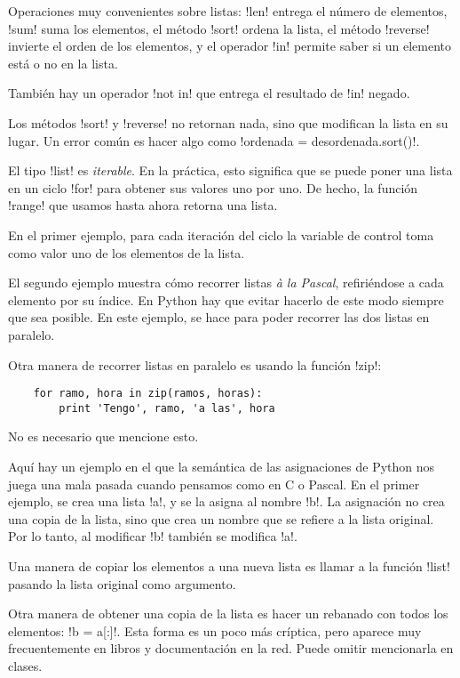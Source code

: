\documentclass[10pt]{article}
\begin{document}
  Operaciones muy convenientes sobre listas:
  \li!len! entrega el número de elementos,
  \li!sum! suma los elementos,
  el método \li!sort! ordena la lista,
  el método \li!reverse! invierte el orden de los elementos,
  y el operador \li!in! permite saber si un elemento está o no en la lista.

  También hay un operador \li!not in! que entrega el resultado de \li!in! negado.

  Los métodos \li!sort! y \li!reverse! no retornan nada,
  sino que modifican la lista en su lugar.
  Un error común es hacer algo como \li!ordenada = desordenada.sort()!.


  El tipo \li!list! es \emph{iterable}.
  En la práctica, esto significa que se puede poner una lista en un ciclo \li!for!
  para obtener sus valores uno por uno. De hecho, la función \li!range! que usamos hasta ahora
  retorna una lista.

  En el primer ejemplo,
  para cada iteración del ciclo la variable de control toma como valor
  uno de los elementos de la lista.

  El segundo ejemplo muestra cómo recorrer listas \emph{à la Pascal},
  refiriéndose a cada elemento por su índice.
  En Python hay que evitar hacerlo de este modo siempre que sea posible.
  En este ejemplo, se hace para poder recorrer las dos listas en paralelo.

  Otra manera de recorrer listas en paralelo
  es usando la función \li!zip!:
  \begin{lstlisting}
    for ramo, hora in zip(ramos, horas):
        print 'Tengo', ramo, 'a las', hora
  \end{lstlisting}
  No es necesario que mencione esto.


  Aquí hay un ejemplo en el que la semántica de las asignaciones de Python
  nos juega una mala pasada cuando pensamos como en C o Pascal.
  En el primer ejemplo,
  se crea una lista \li!a!, y se la asigna al nombre \li!b!.
  La asignación no crea una copia de la lista,
  sino que crea un nombre que se refiere a la lista original.
  Por lo tanto, al modificar \li!b! también se modifica \li!a!.

  Una manera de copiar los elementos a una nueva lista
  es llamar a la función \li!list!
  pasando la lista original como argumento.

  Otra manera de obtener una copia de la lista
  es hacer un rebanado con todos los elementos: \li!b = a[:]!.
  Esta forma es un poco más críptica,
  pero aparece muy frecuentemente en libros y documentación en la red.
  Puede omitir mencionarla en clases.
\end{document}
